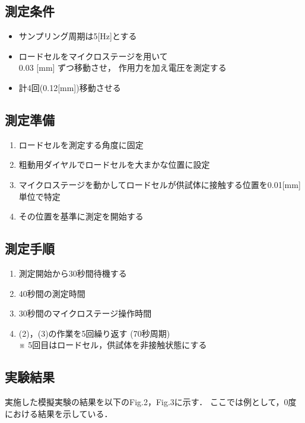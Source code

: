 \documentclass[twocolumn,a4j]{jsarticle}
\begin{document}
\subsection{測定条件}
    \begin{itemize}
        \item サンプリング周期は5[Hz]とする
        \item ロードセルをマイクロステージを用いて\\
              0.03 [mm] ずつ移動させ，
              作用力を加え電圧を測定する
        \item 計4回(0.12[mm])移動させる
    \end{itemize}

\subsection{測定準備}
    \begin{enumerate}[(1)]
        \item ロードセルを測定する角度に固定
        \item 粗動用ダイヤルでロードセルを大まかな位置に設定
        \item マイクロステージを動かしてロードセルが供試体に接触する位置を0.01[mm]単位で特定
        \item その位置を基準に測定を開始する
    \end{enumerate}

\subsection{測定手順}
    \begin{enumerate}[(1)]
        \item 測定開始から30秒間待機する
        \item 40秒間の測定時間
        \item 30秒間のマイクロステージ操作時間
        \item (2)，(3)の作業を5回繰り返す (70秒周期)\\
              ※ 5回目はロードセル，供試体を非接触状態にする
    \end{enumerate}

\newpage

\subsection{実験結果}
実施した模擬実験の結果を以下のFig.2，Fig.3に示す．
ここでは例として，0度における結果を示している．
\end{document}
